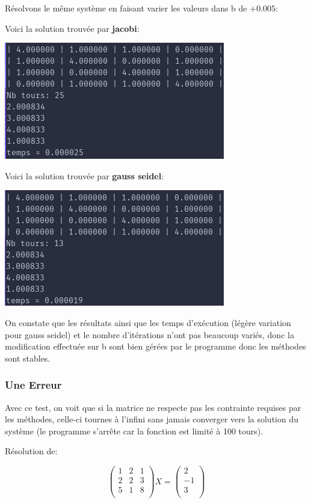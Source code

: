 \documentclass[a4paper]{article}
\begin{document}
Résolvons le même système en faisant varier les valeurs dans b de $+0.005$:

Voici la solution trouvée par \textbf{jacobi}:

\includegraphics[scale=0.5]{./img/jacobi/jac_ex_1_mod.png}

Voici la solution trouvée par \textbf{gauss seidel}:

\includegraphics[scale=0.5]{./img/gauss_seidel/g_e_ex_1_mod.png}

On constate que les résultats ainsi que les temps d’exécution (légère variation
pour gauss seidel) et le nombre d'itérations n'ont pas beaucoup variés, donc la
modification effectuée sur b sont bien gérées par le programme donc les méthodes
sont stables.

\subsubsection{Une Erreur}

Avec ce test, on voit que si la matrice ne respecte pas les contrainte requises
par les méthodes, celle-ci tournes à l'infini sans jamais converger vers la
solution du système (le programme s'arrête car la fonction est limité à 100 tours).

Résolution de:

\[
\begin{pmatrix}
  1 & 2 & 1\\
  2 & 2 & 3\\
  5 & 1 & 8\\
\end{pmatrix} X =
\begin{pmatrix}
  2\\
  -1\\
  3\\
\end{pmatrix}
\]
\end{document}
